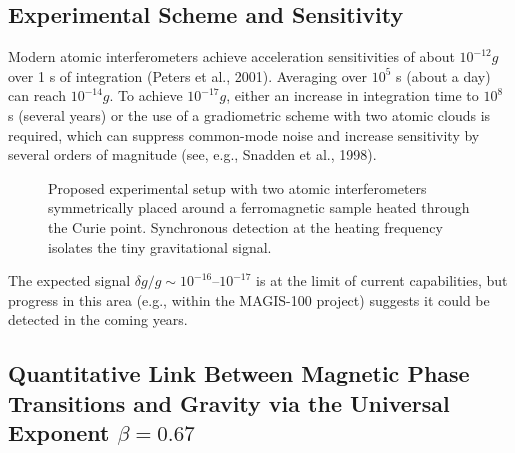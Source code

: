 \documentclass[12pt]{article}
\theoremstyle{remark}
\begin{document}
	\subsection{Experimental Scheme and Sensitivity}
	\label{subsec:lab-scheme}
	
	Modern atomic interferometers achieve acceleration sensitivities of about $10^{-12}g$ over 1 s of integration (Peters et al., 2001). Averaging over $10^5$ s (about a day) can reach $10^{-14}g$. To achieve $10^{-17}g$, either an increase in integration time to $10^8$ s (several years) or the use of a gradiometric scheme with two atomic clouds is required, which can suppress common-mode noise and increase sensitivity by several orders of magnitude (see, e.g., Snadden et al., 1998). 
	
	\begin{figure}[htbp]
		\centering
		\caption{Proposed experimental setup with two atomic interferometers symmetrically placed around a ferromagnetic sample heated through the Curie point. Synchronous detection at the heating frequency isolates the tiny gravitational signal.}
		\label{fig:lab-setup}
	\end{figure}
	
	The expected signal $\delta g/g \sim 10^{-16}$–$10^{-17}$ is at the limit of current capabilities, but progress in this area (e.g., within the MAGIS-100 project) suggests it could be detected in the coming years.
	
	\subsection{Quantitative Link Between Magnetic Phase Transitions and Gravity via the Universal Exponent \(\beta = 0.67\)}
	\label{subsec:magnetic-gravity-link}
	
\end{document}
